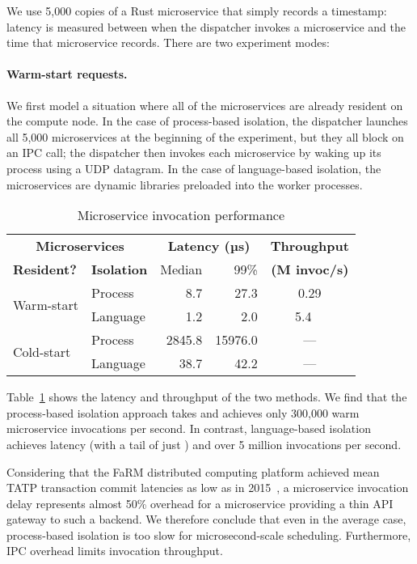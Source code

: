 \noindent
We use 5,000 copies of a Rust microservice that simply records a timestamp:\@
latency is measured between when the dispatcher invokes a microservice
and the time that microservice records.  There are two experiment modes:

\paragraph{Warm-start requests.}
We first model a situation where all of the microservices are already resident on the
compute node.  In the case of process-based isolation, the dispatcher launches all
5,000 microservices at the beginning of the experiment, but they all block on an IPC
call; the dispatcher then invokes each microservice by waking up its process using a
UDP datagram.  In the case of language-based isolation, the microservices are
dynamic libraries preloaded into the worker processes.

\begin{table}
\begin{center}
\small
\begin{tabular}{@{}llrrc@{}}
  \multicolumn{2}{c}{\textbf{Microservices}} & \multicolumn{2}{c}{\textbf{Latency (µs)}} & \textbf{Throughput} \\
  \textbf{Resident?} & \textbf{Isolation} & Median & 99\% & \textbf{(M invoc/s)} \\
\midrule
\multirow{2}{*}{Warm-start} & Process & 8.7 & 27.3 & 0.29 \\
& Language & 1.2 & 2.0 & 5.4~~ \\
\midrule
\multirow{2}{*}{Cold-start} & Process & 2845.8 & 15976.0 & \multicolumn{1}{c}{---} \\
& Language & 38.7 & 42.2 & \multicolumn{1}{c}{---} \\
\end{tabular}
\caption{Microservice invocation performance}
\label{tab:invocperf}
\end{center}
\vspace{-12pt}
\end{table}

Table~\ref{tab:invocperf} shows the latency and throughput of the two
methods.  We find that the process-based isolation approach takes  and achieves
only 300,000 warm microservice invocations per second. In contrast, language-based
isolation achieves  latency (with a tail of just ) and over 5 million
invocations per second.

Considering that the FaRM distributed computing platform
achieved mean TATP transaction commit latencies as low as
 in 2015~\cite{Dragojevic:sosp2015}, a  microservice invocation delay
represents almost 50\% overhead for a microservice providing a thin API
gateway to such a backend.  We therefore conclude that even in the average
case, process-based isolation is too slow for microsecond-scale scheduling.
Furthermore, IPC overhead limits invocation throughput.

